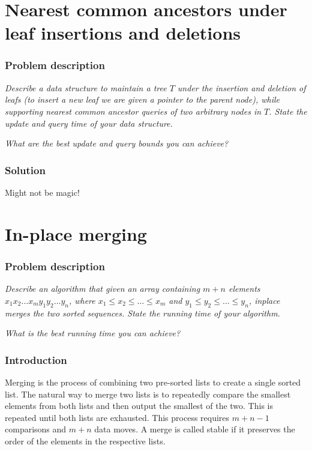 \documentclass[a4paper,oneside,article,11pt]{memoir}
\begin{document}
\chapter{Nearest common ancestors under leaf insertions and deletions}
\label{chp:LCA}
\subsection{Problem description}
\textit{Describe a data structure to maintain a tree $T$ under the insertion and deletion of leafs (to insert a new leaf we are given a pointer to the parent node), while supporting nearest common ancestor queries of two arbitrary nodes in $T$. State the update and query time of your data structure.}

\textit{What are the best update and query bounds you can achieve?}

\subsection{Solution}
Might not be magic!

\chapter{In-place merging}
\label{chp:inplace}
\subsection{Problem description}
\textit{Describe an algorithm that given an array containing $m+n$ elements $x_1x_2\dots x_m y_1y_2\dots y_n$, where $x_1\leq x_2\leq \dots \leq x_m$ and $y_1\leq y_2\leq \dots \leq y_n$, inplace merges the two sorted sequences. State the running time of your algorithm.}

\textit{What is the best running time you can achieve?}

\subsection{Introduction}
Merging is the process of combining two pre-sorted lists to create a single sorted list. The natural way to merge two lists is to repeatedly compare the smallest elements from both lists and then output the smallest of the two. This is repeated until both lists are exhausted. This process requires $m+n-1$ comparisons and $m+n$ data moves. A merge is called stable if it preserves the order of the elements in the respective lists.
\end{document}
